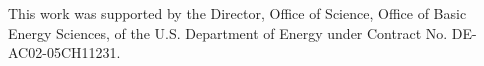 \documentclass{iucr}              %
\begin{document}
 
This work was supported by the Director, Office of Science, Office of Basic Energy Sciences, of the U.S. Department of Energy under Contract No. DE-AC02-05CH11231.







% 
% 
% 
% 
\end{document}
